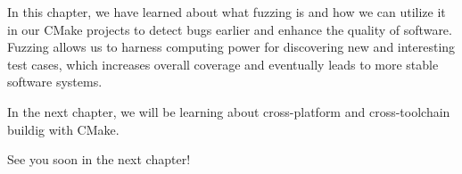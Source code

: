 
In this chapter, we have learned about what fuzzing is and how we can utilize it in our CMake projects to detect bugs earlier and enhance the quality of software. Fuzzing allows us to harness computing power for discovering new and interesting test cases, which increases overall coverage and eventually leads to more stable software systems.

In the next chapter, we will be learning about cross-platform and cross-toolchain buildig with CMake.

See you soon in the next chapter!